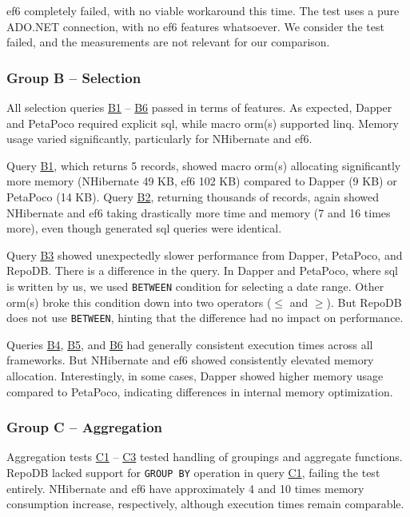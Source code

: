 \acrshort{ef}6 completely failed, with no viable workaround this time. The test uses a pure ADO.NET connection, with no \acrshort{ef}6 features whatsoever. We consider the test failed, and the measurements are not relevant for our comparison.

\subsubsection{Group B -- Selection}
All selection queries \hyperref[query:b1]{B1} -- \hyperref[query:b6]{B6} passed in terms of features. As expected, Dapper and PetaPoco required explicit \acrshort{sql}, while macro \acrshort{orm}(s) supported \acrshort{linq}. Memory usage varied significantly, particularly for NHibernate and \acrshort{ef}6.

Query \hyperref[query:b1]{B1}, which returns 5 records, showed macro \acrshort{orm}(s) allocating significantly more memory (NHibernate 49 KB, \acrshort{ef}6 102 KB) compared to Dapper (9 KB) or PetaPoco (14 KB). Query \hyperref[query:b2]{B2}, returning thousands of records, again showed NHibernate and \acrshort{ef}6 taking drastically more time and memory (7 and 16 times more), even though generated \acrshort{sql} queries were identical.

Query \hyperref[query:b3]{B3} showed unexpectedly slower performance from Dapper, PetaPoco, and RepoDB. There is a difference in the query. In Dapper and PetaPoco, where \acrshort{sql} is written by us, we used \texttt{BETWEEN} condition for selecting a date range. Other \acrshort{orm}(s) broke this condition down into two operators ($\leq$ and $\geq$). But RepoDB does not use \texttt{BETWEEN}, hinting that the difference had no impact on performance.

Queries \hyperref[query:b4]{B4}, \hyperref[query:b5]{B5}, and \hyperref[query:b6]{B6} had generally consistent execution times across all frameworks. But NHibernate and \acrshort{ef}6 showed consistently elevated memory allocation. Interestingly, in some cases, Dapper showed higher memory usage compared to PetaPoco, indicating differences in internal memory optimization. 

\subsubsection{Group C -- Aggregation}
Aggregation tests \hyperref[query:c1]{C1} -- \hyperref[query:c3]{C3} tested handling of groupings and aggregate functions. RepoDB lacked support for \texttt{GROUP BY} operation in query \hyperref[query:c1]{C1}, failing the test entirely. NHibernate and \acrshort{ef}6 have approximately 4 and 10 times memory consumption increase, respectively, although execution times remain comparable. 

